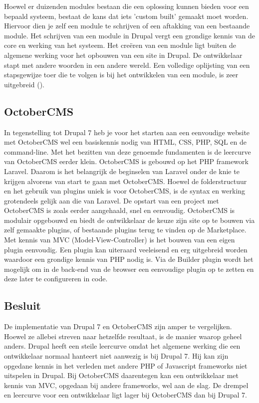 \newline\newline
Hoewel er duizenden modules bestaan die een oplossing kunnen bieden voor een bepaald systeem, bestaat de kans dat iets 'custom built' gemaakt moet worden. Hiervoor dien je zelf een module te schrijven of een aftakking van een bestaande module. Het schrijven van een module in Drupal vergt een grondige kennis van de core en werking van het systeem.
\newline\newline
Het creëren van een module ligt buiten de algemene werking voor het opbouwen van een site in Drupal. De ontwikkelaar stapt met andere woorden in een andere wereld. Een volledige oplijsting van een stapsgewijze toer die te volgen is bij het ontwikkelen van een module, is zeer uitgebreid (\cite{Drupal2015ModuleGuide}).

\subsection{OctoberCMS}
In tegenstelling tot Drupal 7 heb je voor het starten aan een eenvoudige website met OctoberCMS wel een basiskennis nodig van HTML, CSS, PHP, SQL en de command-line. Met het bezitten van deze genoemde fundamenten is de leercurve van OctoberCMS eerder klein. 
\newline\newline
OctoberCMS is gebouwd op het PHP framework Laravel. Daarom is het belangrijk de beginselen van Laravel onder de knie te krijgen alvorens van start te gaan met OctoberCMS. Hoewel de folderstructuur en het gebruik van plugins uniek is voor OctoberCMS, is de syntax en werking grotendeels gelijk aan die van Laravel. 
\newline\newline
De opstart van een project met OctoberCMS is zoals eerder aangehaald, snel en eenvoudig. OctoberCMS is modulair opgebouwd en biedt de ontwikkelaar de keuze zijn site op te bouwen via zelf gemaakte plugins, of bestaande plugins terug te vinden op de Marketplace. Met kennis van MVC (Model-View-Controller) is het bouwen van een eigen plugin eenvoudig. Een plugin kan uiteraard veeleisend en erg uitgebreid worden waardoor een grondige kennis van PHP nodig is. Via de Builder plugin wordt het mogelijk om in de back-end van de browser een eenvoudige plugin op te zetten en deze later te configureren in code. 

\subsection{Besluit}
De implementatie van Drupal 7 en OctoberCMS zijn amper te vergelijken. Hoewel ze allebei streven naar hetzelfde resultaat, is de manier waarop geheel anders. Drupal heeft een steile leercurve omdat het algemene werking die een ontwikkelaar normaal hanteert niet aanwezig is bij Drupal 7. Hij kan zijn opgedane kennis in het verleden met andere PHP of Javascript frameworks niet uitspelen in Drupal. Bij OctoberCMS daarentegen kan een ontwikkelaar met kennis van MVC, opgedaan bij andere frameworks, wel aan de slag. De drempel en leercurve voor een ontwikkelaar ligt lager bij OctoberCMS dan bij Drupal 7. 


